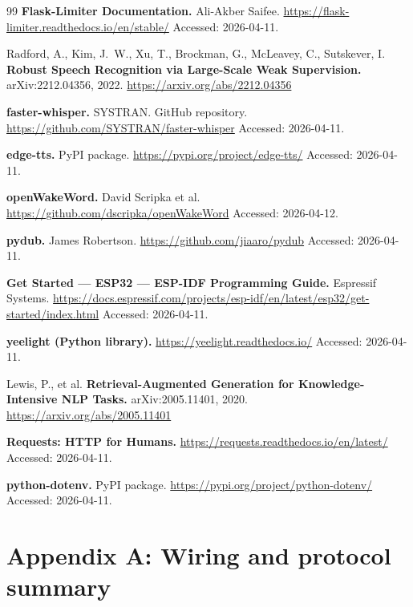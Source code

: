 \documentclass[12pt,a4paper]{report}
\begin{document}
\begin{thebibliography}{99}
\textbf{Flask-Limiter Documentation.} Ali-Akber Saifee.
\newblock \url{https://flask-limiter.readthedocs.io/en/stable/}
\newblock Accessed: 2026-04-11.

Radford, A., Kim, J.~W., Xu, T., Brockman, G., McLeavey, C., Sutskever, I.
\newblock \textbf{Robust Speech Recognition via Large-Scale Weak Supervision.} arXiv:2212.04356, 2022.
\newblock \url{https://arxiv.org/abs/2212.04356}

\textbf{faster-whisper.} SYSTRAN.
\newblock GitHub repository.
\newblock \url{https://github.com/SYSTRAN/faster-whisper}
\newblock Accessed: 2026-04-11.

\textbf{edge-tts.} PyPI package.
\newblock \url{https://pypi.org/project/edge-tts/}
\newblock Accessed: 2026-04-11.

\textbf{openWakeWord.} David Scripka et al.
\newblock \url{https://github.com/dscripka/openWakeWord}
\newblock Accessed: 2026-04-12.

\textbf{pydub.} James Robertson.
\newblock \url{https://github.com/jiaaro/pydub}
\newblock Accessed: 2026-04-11.

\textbf{Get Started --- ESP32 --- ESP-IDF Programming Guide.} Espressif Systems.
\newblock \url{https://docs.espressif.com/projects/esp-idf/en/latest/esp32/get-started/index.html}
\newblock Accessed: 2026-04-11.

\textbf{yeelight (Python library).}
\newblock \url{https://yeelight.readthedocs.io/}
\newblock Accessed: 2026-04-11.

Lewis, P., et al.
\newblock \textbf{Retrieval-Augmented Generation for Knowledge-Intensive NLP Tasks.} arXiv:2005.11401, 2020.
\newblock \url{https://arxiv.org/abs/2005.11401}

\textbf{Requests: HTTP for Humans.}
\newblock \url{https://requests.readthedocs.io/en/latest/}
\newblock Accessed: 2026-04-11.

\textbf{python-dotenv.} PyPI package.
\newblock \url{https://pypi.org/project/python-dotenv/}
\newblock Accessed: 2026-04-11.

\end{thebibliography}

\appendix

\chapter{Appendix A: Wiring and protocol summary}
\label{app:a}
\end{document}

